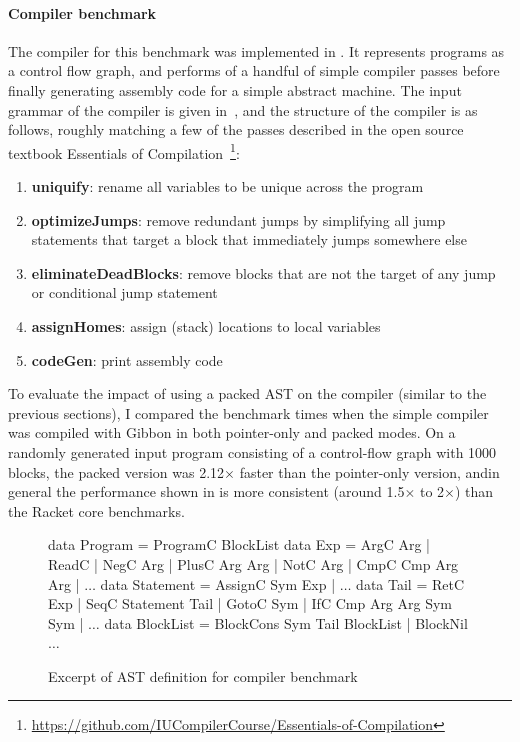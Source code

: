 \paragraph{Compiler benchmark}
The compiler for this benchmark was implemented in \lamadt{}. It represents
programs as a control flow graph, and performs of a handful of simple compiler
passes before finally generating assembly code for a simple abstract machine.
The input grammar of the compiler is given
in~, and the structure of the compiler is as
follows, roughly matching a few of the passes described
in the open source textbook Essentials of Compilation~\footnote{\url{https://github.com/IUCompilerCourse/Essentials-of-Compilation}}:
%
\begin{enumerate}
  \item \textbf{uniquify}: rename all variables to be unique across the program
  \item \textbf{optimizeJumps}: remove redundant jumps by simplifying all jump
        statements that target a block that immediately jumps somewhere else
  \item \textbf{eliminateDeadBlocks}: remove blocks that are not the target of
        any jump or conditional jump statement
  \item \textbf{assignHomes}: assign (stack) locations to local variables
  \item \textbf{codeGen}: print assembly code
\end{enumerate}

To evaluate the impact of using a packed AST on the compiler (similar to the
previous sections), I compared the benchmark times when the simple compiler was
compiled with Gibbon in both pointer-only and packed modes. On a randomly
generated input program consisting of a control-flow graph with 1000 blocks, the
packed version was 2.12$\times$ faster than the pointer-only version, andin general
the performance shown in  is more consistent
(around 1.5$\times$ to 2$\times$) than the Racket core benchmarks.

\begin{figure}
\footnotesize
\begin{code}
data Program = ProgramC BlockList
data Exp = ArgC Arg | ReadC | NegC Arg | PlusC Arg Arg | NotC Arg
         | CmpC Cmp Arg Arg | $\ldots$
data Statement = AssignC Sym Exp | $\ldots$
data Tail = RetC Exp | SeqC Statement Tail | GotoC Sym
          | IfC Cmp Arg Arg Sym Sym | $\ldots$
data BlockList = BlockCons Sym Tail BlockList | BlockNil
$\ldots$
\end{code}
\caption{Excerpt of AST definition for compiler benchmark}\label{fig:coursecompilergrammar}
\end{figure}


